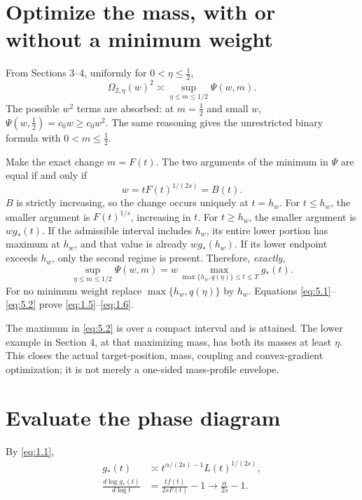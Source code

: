 \section{Optimize the mass, with or without a minimum weight}

From Sections 3--4, uniformly for $0<\eta\le\tfrac12$,
\begin{equation}
  \Omega_{2,\eta}(w)^2\asymp\sup_{\eta\le m\le1/2}\Psi(w,m).
  \tag{5.1}\label{eq:5.1}
\end{equation}
The possible $w^2$ terms are absorbed: at $m=\tfrac12$ and small $w$, $\Psi(w,\tfrac12)=c_0w\ge c_0w^2$. The same reasoning gives the unrestricted binary formula with $0<m\le\tfrac12$.

Make the exact change $m=F(t)$. The two arguments of the minimum in $\Psi$ are equal if and only if
\[
  w=tF(t)^{1/(2s)}=B(t).
\]
$B$ is strictly increasing, so the change occurs uniquely at $t=h_w$. For $t\le h_w$, the smaller argument is $F(t)^{1/s}$, increasing in $t$. For $t\ge h_w$, the smaller argument is $wg_*(t)$. If the admissible interval includes $h_w$, its entire lower portion has maximum at $h_w$, and that value is already $wg_*(h_w)$. If its lower endpoint exceeds $h_w$, only the second regime is present. Therefore, \emph{exactly},
\begin{equation}
  \sup_{\eta\le m\le1/2}\Psi(w,m)
  =w\max_{\max\{h_w,q(\eta)\}\le t\le T}g_*(t).
  \tag{5.2}\label{eq:5.2}
\end{equation}
For no minimum weight replace $\max\{h_w,q(\eta)\}$ by $h_w$. Equations \eqref{eq:5.1}--\eqref{eq:5.2} prove \eqref{eq:1.5}--\eqref{eq:1.6}.

The maximum in \eqref{eq:5.2} is over a compact interval and is attained. The lower example in Section 4, at that maximizing mass, has both its masses at least $\eta$. This closes the actual target-position, mass, coupling and convex-gradient optimization; it is not merely a one-sided mass-profile envelope.

\section{Evaluate the phase diagram}

By \eqref{eq:1.1},
\begin{equation}
  \begin{aligned}
  g_*(t)&\asymp t^{\alpha/(2s)-1}L(t)^{1/(2s)},\\
  \frac{d\log g_*(t)}{d\log t}
    &=\frac{tf(t)}{2sF(t)}-1
      \longrightarrow\frac{\alpha}{2s}-1.
  \end{aligned}
  \tag{6.1}\label{eq:6.1}
\end{equation}

